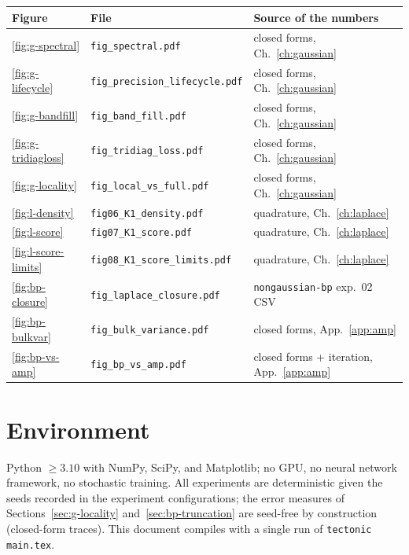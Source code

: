 \begin{center}\small
\begin{tabular}{@{}lll@{}}
\toprule
Figure & File & Source of the numbers \\
\midrule
\ref{fig:g-spectral} & \texttt{fig\_spectral.pdf} & closed forms, Ch.~\ref{ch:gaussian} \\
\ref{fig:g-lifecycle} & \texttt{fig\_precision\_lifecycle.pdf} & closed forms, Ch.~\ref{ch:gaussian} \\
\ref{fig:g-bandfill} & \texttt{fig\_band\_fill.pdf} & closed forms, Ch.~\ref{ch:gaussian} \\
\ref{fig:g-tridiagloss} & \texttt{fig\_tridiag\_loss.pdf} & closed forms, Ch.~\ref{ch:gaussian} \\
\ref{fig:g-locality} & \texttt{fig\_local\_vs\_full.pdf} & closed forms, Ch.~\ref{ch:gaussian} \\
\ref{fig:l-density} & \texttt{fig06\_K1\_density.pdf} & quadrature, Ch.~\ref{ch:laplace} \\
\ref{fig:l-score} & \texttt{fig07\_K1\_score.pdf} & quadrature, Ch.~\ref{ch:laplace} \\
\ref{fig:l-score-limits} & \texttt{fig08\_K1\_score\_limits.pdf} & quadrature, Ch.~\ref{ch:laplace} \\
\ref{fig:bp-closure} & \texttt{fig\_laplace\_closure.pdf} & \texttt{nongaussian-bp} exp.~02 CSV \\
\ref{fig:bp-bulkvar} & \texttt{fig\_bulk\_variance.pdf} & closed forms, App.~\ref{app:amp} \\
\ref{fig:bp-vs-amp} & \texttt{fig\_bp\_vs\_amp.pdf} & closed forms + iteration, App.~\ref{app:amp} \\
\bottomrule
\end{tabular}
\end{center}

\section{Environment}

Python $\geq 3.10$ with NumPy, SciPy, and Matplotlib; no GPU, no neural
network framework, no stochastic training. All experiments are
deterministic given the seeds recorded in the experiment configurations;
the error measures of Sections~\ref{sec:g-locality}
and~\ref{sec:bp-truncation} are seed-free by construction (closed-form
traces). This document compiles with a single run of
\texttt{tectonic main.tex}.
